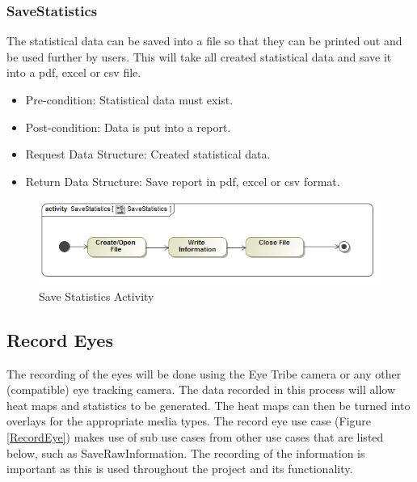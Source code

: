 		\subsubsection{SaveStatistics}
The statistical data can be saved into a file so that they can be printed out and be used further by users. This will take all created statistical data and save it into a pdf, excel or csv file.
\begin{itemize}
\item Pre-condition: Statistical data must exist.
\item Post-condition: Data is put into a report.
\item Request Data Structure: Created statistical data.
\item Return Data Structure: Save report in pdf, excel or csv format.
\end{itemize}

\begin{figure}[!ht]
	\centering
	\includegraphics[scale=0.5,width=15cm,keepaspectratio]{Diagrams/Activity_Diagram__SaveStatistics__SaveStatistics.png}
	\caption{Save Statistics Activity}
	\end{figure}
	
\subsection{Record Eyes}
The recording of the eyes will be done using the Eye Tribe camera or any other (compatible) eye tracking camera. The data recorded in this process will allow heat maps and statistics to be generated. The heat maps can then be turned into overlays for the appropriate media types. The record eye use case (Figure \ref{RecordEye}) makes use of sub use cases from other use cases that are listed below, such as SaveRawInformation. The recording of the information is important as this is used throughout the project and its functionality.
\newline

